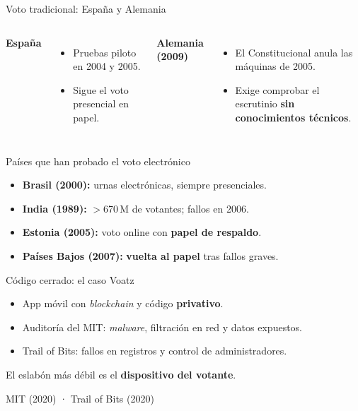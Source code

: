\documentclass[aspectratio=169,12pt]{beamer}
\def\navprev{}
\def\navnext{}
\newcommand{\nav}[2]{\gdef\navprev{#1}\gdef\navnext{#2}}
\newcommand{\fuente}[1]{\vfill{\small\color{gris}#1\par}}
\begin{document}
\nav{Papel vs. electrónico}{Experiencia internacional}
\begin{frame}{Voto tradicional: España y Alemania}
  \vspace{0.3cm}
  \begin{columns}[T]
      {\color{azul}\Large\bfseries España}\\[0.25cm]
      \begin{itemize}
        \item Pruebas piloto en 2004 y 2005.
        \item Sigue el voto presencial en papel.
      \end{itemize}
      {\color{terra}\Large\bfseries Alemania (2009)}\\[0.25cm]
      \begin{itemize}
        \item El Constitucional anula las máquinas de 2005.
        \item Exige comprobar el escrutinio \alert{\textbf{sin conocimientos técnicos}}.
      \end{itemize}
  \end{columns}
\end{frame}

\nav{Voto tradicional}{Voatz}
\begin{frame}{Países que han probado el voto electrónico}
  \vspace{0.2cm}
  \begin{itemize}
    \item \textbf{Brasil (2000):} urnas electrónicas, siempre presenciales.
    \item \textbf{India (1989):} $>$670\,M de votantes; fallos en 2006.
    \item \textbf{Estonia (2005):} voto online con \alert{\textbf{papel de respaldo}}.
    \item \textbf{Países Bajos (2007):} \alert{\textbf{vuelta al papel}} tras fallos graves.
  \end{itemize}
\end{frame}

\nav{Experiencia internacional}{Voatz, Helios, Belenios}
\begin{frame}{Código cerrado: el caso Voatz}
  \begin{itemize}
    \item App móvil con \textit{blockchain} y código \alert{\textbf{privativo}}.
    \item Auditoría del MIT: \textit{malware}, filtración en red y datos expuestos.
    \item Trail of Bits: fallos en registros y control de administradores.
  \end{itemize}
  \vspace{0.35cm}
  {\large El eslabón más débil es el \alert{\textbf{dispositivo del votante}}.}
  \fuente{MIT (2020) · Trail of Bits (2020)}
\end{frame}
\end{document}
